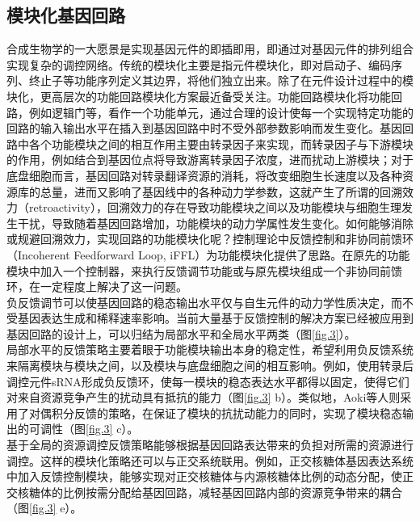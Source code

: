 \documentclass[b5paper,9pt,oneolumn,twoside,UTF8]{article}
\begin{document}
\subsection{模块化基因回路}
合成生物学的一大愿景是实现基因元件的即插即用\cite{endy2005foundations}，即通过对基因元件的排列组合实现复杂的调控网络。传统的模块化主要是指元件模块化，即对启动子、编码序列、终止子等功能序列定义其边界，将他们独立出来。除了在元件设计过程中的模块化，更高层次的功能回路模块化方案最近备受关注。功能回路模块化将功能回路，例如逻辑门等，看作一个功能单元，通过合理的设计使每一个实现特定功能的回路的输入输出水平在插入到基因回路中时不受外部参数影响而发生变化\cite{10.1016/j.copbio.2019.11.015}。基因回路中各个功能模块之间的相互作用主要由转录因子来实现，而转录因子与下游模块的作用，例如结合到基因位点将导致游离转录因子浓度，进而扰动上游模块；对于底盘细胞而言，基因回路对转录翻译资源的消耗，将改变细胞生长速度以及各种资源库的总量，进而又影响了基因线中的各种动力学参数，这就产生了所谓的回溯效力（retroactivity）\cite{Qian2017}，回溯效力的存在导致功能模块之间以及功能模块与细胞生理发生干扰，导致随着基因回路增加，功能模块的动力学属性发生变化。如何能够消除或规避回溯效力，实现回路的功能模块化呢？控制理论中反馈控制和非协同前馈环（Incoherent Feedforward Loop, iFFL）\cite{Mangan2003}为功能模块化提供了思路。在原先的功能模块中加入一个控制器，来执行反馈调节功能或与原先模块组成一个非协同前馈环，在一定程度上解决了这一问题。\\
\indent 负反馈调节可以使基因回路的稳态输出水平仅与自生元件的动力学性质决定，而不受基因表达生成和稀释速率影响。当前大量基于反馈控制的解决方案已经被应用到基因回路的设计上，可以归结为局部水平和全局水平两类（图\ref{fig.3}）。\\
\indent 局部水平的反馈策略主要着眼于功能模块输出本身的稳定性，希望利用负反馈系统来隔离模块与模块之间，以及模块与底盘细胞之间的相互影响\cite{Shopera2017,huang2018}。例如，使用转录后调控元件sRNA形成负反馈环，使每一模块的稳态表达水平都得以固定，使得它们对来自资源竞争产生的扰动具有抵抗的能力（图\ref{fig.3} b）\cite{huang2018}。类似地，Aoki等人则采用了对偶积分反馈的策略，在保证了模块的抗扰动能力的同时，实现了模块稳态输出的可调性（图\ref{fig.3} c）\cite{Stephanie2019}。\\
\indent 基于全局的资源调控反馈策略能够根据基因回路表达带来的负担对所需的资源进行调控。这样的模块化策略还可以与正交系统联用。例如，正交核糖体基因表达系统中加入反馈控制模块，能够实现对正交核糖体与内源核糖体比例的动态分配，使正交核糖体的比例按需分配给基因回路，减轻基因回路内部的资源竞争带来的耦合（图\ref{fig.3} e）\cite{Darlington2018}。\\
\end{document}
